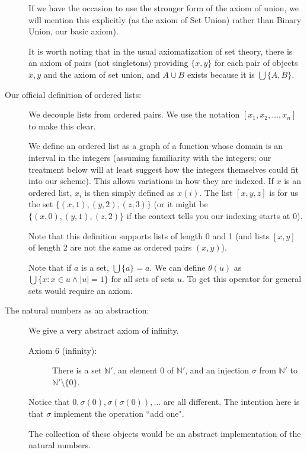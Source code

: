 \documentclass[12pt]{article}
\begin{document}
\begin{description}
If we have the occasion to use the stronger form of the axiom of union, we will mention this explicitly (as the axiom of Set Union) rather than Binary Union, our basic axiom).

It is worth noting that in the usual axiomatization of set theory, there is an axiom of pairs (not singletons) providing
$\{x,y\}$ for each pair of objects $x,y$ and the axiom of set union, and $A \cup B$ exists because it is $\bigcup \{A,B\}$.

\item[Our official definition of ordered lists:]  We decouple lists from ordered pairs.  We use the notation
$[x_1,x_2,\ldots,x_n]$ to make this clear.

We define an ordered list as a graph of a function whose domain is an interval in the integers (assuming familiarity with the integers;  our treatment below will at least suggest how the integers themselves could fit into our scheme).  This allows variations in how
they are indexed.  If $x$ is an ordered list, $x_i$ is then simply defined as $x(i)$.  The list $[x,y,z]$ is for us
the set $\{(x,1),(y,2),(z,3)\}$ (or it might be $\{(x,0),(y,1),(z,2)\}$ if the context tells you our indexing starts at 0).

Note that this definition supports lists of length 0 and 1 (and lists $[x,y]$ of length 2 are not the same as ordered pairs $(x,y)$).

Note that if $a$ is a set, $\bigcup \{a\} = a$.  We can define $\theta(u)$ as $\bigcup \{x:x \in u \wedge |u|=1\}$ for all sets of sets $u$.  To get this operator for general sets would require an axiom.

\item[The natural numbers as an abstraction:]

We give a very abstract axiom of infinity.

\begin{description}

\item[Axiom 6 (infinity):]  There is a set $\mathbb N'$, an element 0 of $\mathbb N'$, and an injection $\sigma$ from $\mathbb N'$ to $\mathbb N' \setminus \{0\}$.

\end{description}

Notice that $0, \sigma(0), \sigma(\sigma(0)),\ldots$ are all different.  The intention here is that $\sigma$ implement the operation ``add one".

The collection of these objects would be an abstract implementation of the natural numbers.


\end{description}
\end{document}
